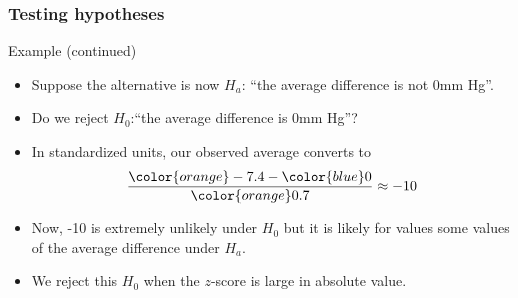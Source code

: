 \documentclass[handout]{beamer}
\begin{document}

   \begin{frame} \frametitle{Testing hypotheses}

   \begin{block}
   {Example (continued)}
   \begin{itemize}

   \item Suppose the alternative is now $H_a$: ``the average difference is not 0mm Hg''.

   \item Do we reject $H_0$:``the average difference is 0mm Hg''?

    \item In standardized units, our observed average converts to
    $$
    \frac{{\color{orange}-7.4} - {\color{blue} 0}}{\color{orange} 0.7} \approx -10
    $$

   \item Now, -10 is extremely unlikely under $H_0$ but it is likely
   for values some values of the average difference under $H_a$.

   \item We reject this $H_0$ when the $z$-score is large in absolute value.
   \end{itemize}
   \end{block}
   \end{frame}

\end{document}
